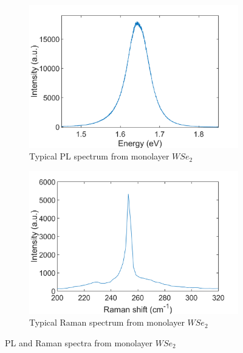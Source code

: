 \begin{figure}[!h]
	\begin{center}
		\begin{subfigure}[b]{0.35\textwidth}
			\includegraphics[scale=0.2]{WSe2/PLSpectrum.png}
			\caption{Typical PL spectrum from monolayer $WSe_2$}
			\label{fig:WSe2PLSpectrum}
		\end{subfigure}
		\qquad
		\begin{subfigure}[b]{0.35\textwidth}
			\includegraphics[scale=0.2]{WSe2/RamanSpectrum.png}
			\caption{Typical Raman spectrum from monolayer $WSe_2$}
			\label{fig:WSe2RamanSpectrum}
		\end{subfigure}
		\caption{PL and Raman spectra from monolayer $WSe_2$}
		\label{fig:WSe2PLRamanSpectra}
	\end{center}
\end{figure}
	
